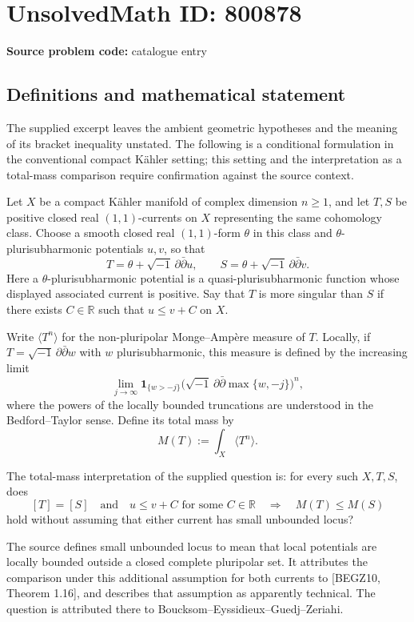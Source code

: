 \documentclass[11pt]{article}
\newcommand{\R}{\mathbb{R}}
\begin{document}
\section*{UnsolvedMath ID: 800878}
\textbf{Source problem code:} catalogue entry
\subsection{Definitions and mathematical statement}
The supplied excerpt leaves the ambient geometric hypotheses and the meaning of its bracket inequality unstated. The following is a conditional formulation in the conventional compact K\"ahler setting; this setting and the interpretation as a total-mass comparison require confirmation against the source context.

Let \(X\) be a compact K\"ahler manifold of complex dimension \(n\geq 1\), and let \(T,S\) be positive closed real \((1,1)\)-currents on \(X\) representing the same cohomology class. Choose a smooth closed real \((1,1)\)-form \(\theta\) in this class and \(\theta\)-plurisubharmonic potentials \(u,v\), so that
\[
T=\theta+\sqrt{-1}\,\partial\bar\partial u,
\qquad
S=\theta+\sqrt{-1}\,\partial\bar\partial v.
\]
Here a \(\theta\)-plurisubharmonic potential is a quasi-plurisubharmonic function whose displayed associated current is positive. Say that \(T\) is more singular than \(S\) if there exists \(C\in\R\) such that \(u\leq v+C\) on \(X\).

Write \(\langle T^n\rangle\) for the non-pluripolar Monge--Amp\`ere measure of \(T\). Locally, if \(T=\sqrt{-1}\,\partial\bar\partial w\) with \(w\) plurisubharmonic, this measure is defined by the increasing limit
\[
\lim_{j\to\infty}
\mathbf{1}_{\{w>-j\}}
\bigl(\sqrt{-1}\,\partial\bar\partial\max\{w,-j\}\bigr)^n,
\]
where the powers of the locally bounded truncations are understood in the Bedford--Taylor sense. Define its total mass by
\[
M(T):=\int_X\langle T^n\rangle.
\]

The total-mass interpretation of the supplied question is: for every such \(X,T,S\), does
\[
[T]=[S]\quad\text{and}\quad u\leq v+C\text{ for some }C\in\R
\quad\Longrightarrow\quad
M(T)\leq M(S)
\]
hold without assuming that either current has small unbounded locus?

The source defines small unbounded locus to mean that local potentials are locally bounded outside a closed complete pluripolar set. It attributes the comparison under this additional assumption for both currents to [BEGZ10, Theorem 1.16], and describes that assumption as apparently technical. The question is attributed there to Boucksom--Eyssidieux--Guedj--Zeriahi.
\end{document}
